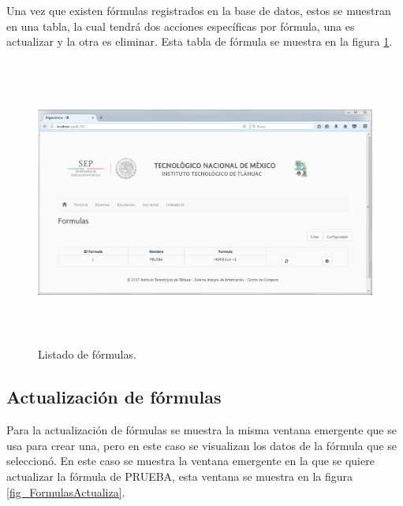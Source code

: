 		    Una vez que existen f\'ormulas registrados en la base de datos, estos se muestran en una tabla, la cual tendr\'a dos acciones espec\'ificas por f\'ormula, una es actualizar y la otra es eliminar. Esta tabla de f\'ormula se muestra en la figura \ref{fig_FormulasTabla}.\\

		    \begin{figure}[]
		        \centering
		        \includegraphics[width=16cm, height=9.5cm]{figuras/FormulasTabla}
		        \caption{Listado de f\'ormulas.}
		        \label{fig_FormulasTabla}
		    \end{figure}
			
			\subsection{Actualizaci\'on de f\'ormulas}

			Para la actualizaci\'on de f\'ormulas se muestra la misma ventana emergente que se usa para crear una, pero en este caso se visualizan los datos de la f\'ormula que se seleccion\'o. En este caso se muestra la ventana emergente en la que se quiere actualizar la f\'ormula de PRUEBA, esta ventana se muestra en la figura \ref{fig_FormulasActualiza}.

